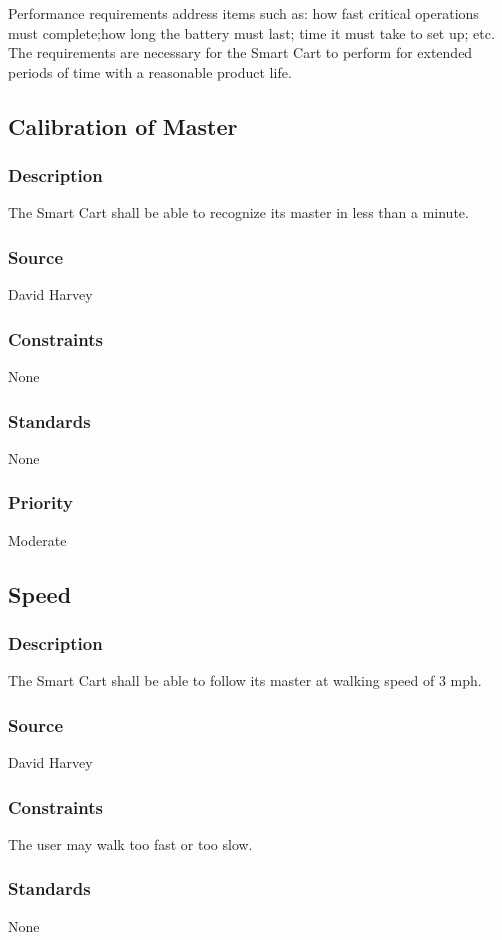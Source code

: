 Performance requirements address items such as: how fast critical operations must complete;how long the battery must last; time it must take to set up; etc. The requirements are necessary for the Smart Cart to perform for extended periods of time with a reasonable product life. 

\subsection{Calibration of Master}
\subsubsection{Description}
The Smart Cart shall be able to recognize its master in less than a minute.
\subsubsection{Source}
David Harvey
\subsubsection{Constraints}
None
\subsubsection{Standards}
None
\subsubsection{Priority}
Moderate


\subsection{Speed}
\subsubsection{Description}
The Smart Cart shall be able to follow its master at walking speed of 3 mph. 
\subsubsection{Source}
David Harvey
\subsubsection{Constraints}
The user may walk too fast or too slow. 
\subsubsection{Standards}
None
